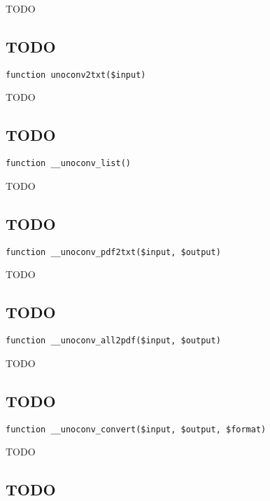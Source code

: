 \documentclass[a4paper]{book}
\begin{document}
TODO

\hypertarget{toc288}{}
\subsection{TODO}

\begin{lstlisting}
function unoconv2txt($input)
\end{lstlisting}

TODO

\hypertarget{toc289}{}
\subsection{TODO}

\begin{lstlisting}
function __unoconv_list()
\end{lstlisting}

TODO

\hypertarget{toc290}{}
\subsection{TODO}

\begin{lstlisting}
function __unoconv_pdf2txt($input, $output)
\end{lstlisting}

TODO

\hypertarget{toc291}{}
\subsection{TODO}

\begin{lstlisting}
function __unoconv_all2pdf($input, $output)
\end{lstlisting}

TODO

\hypertarget{toc292}{}
\subsection{TODO}

\begin{lstlisting}
function __unoconv_convert($input, $output, $format)
\end{lstlisting}

TODO

\hypertarget{toc293}{}
\subsection{TODO}
\end{document}

